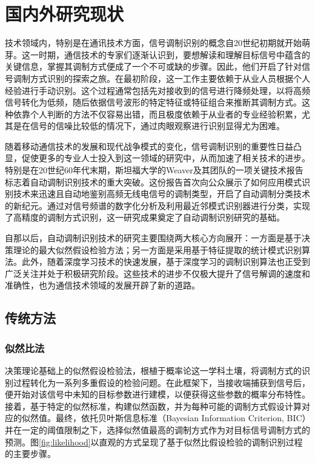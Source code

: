 \section{国内外研究现状}
技术领域内，特别是在通讯技术方面，信号调制识别的概念自20世纪初期就开始萌芽。这一时期，通信技术的专家们逐渐认识到，要想解读和理解目标信号中蕴含的关键信息，掌握其调制方式便成了一个不可或缺的步骤。因此，他们开启了针对信号调制方式识别的探索之旅。在最初阶段，这一工作主要依赖于从业人员根据个人经验进行手动识别。这个过程通常包括先对接收到的信号进行降频处理，以将高频信号转化为低频，随后依据信号波形的特定特征或特征组合来推断其调制方式。这种依靠个人判断的方法不仅容易出错，而且极度依赖于从业者的专业经验积累，尤其是在信号的信噪比较低的情况下，通过肉眼观察进行识别显得尤为困难。

随着移动通信技术的发展和现代战争模式的变化，信号调制识别的重要性日益凸显，促使更多的专业人士投入到这一领域的研究中，从而加速了相关技术的进步。特别是在20世纪60年代末期，斯坦福大学的Weaver及其团队的一项关键技术报告标志着自动调制识别技术的重大突破。这份报告首次向公众展示了如何应用模式识别技术来迅速且自动地鉴别高频无线电信号的调制类型，开启了自动调制分类技术的新纪元\cite{weaver1969automatic}。通过对信号频谱的数字化分析及利用最近邻模式识别器进行分类，实现了高精度的调制方式识别，这一研究成果奠定了自动调制识别研究的基础。

自那以后，自动调制识别技术的研究主要围绕两大核心方向展开：一方面是基于决策理论的最大似然假设检验方法；另一方面是采用基于特征提取的统计模式识别算法。此外，随着深度学习技术的快速发展，基于深度学习的调制识别算法也正受到广泛关注并处于积极研究阶段。这些技术的进步不仅极大提升了信号解调的速度和准确性，也为通信技术领域的发展开辟了新的道路。
\subsection{传统方法}
\subsubsection{似然比法}

决策理论基础上的似然假设检验法，根植于概率论这一学科土壤，将调制方式的识别过程转化为一系列多重假设的检验问题。在此框架下，当接收端捕获到信号后，便开始对该信号中未知的目标参数进行建模，以便获得这些参数的概率分布特性。接着，基于特定的似然标准，构建似然函数，并为每种可能的调制方式假设计算对应的似然值。最终，依托贝叶斯信息标准（Bayesian Information Criterion, BIC）并在一定的阈值限制之下，选择似然值最高的调制方式作为对目标信号调制方式的预测。图\ref{fig:likelihood}以直观的方式呈现了基于似然比假设检验的调制识别过程的主要步骤。


